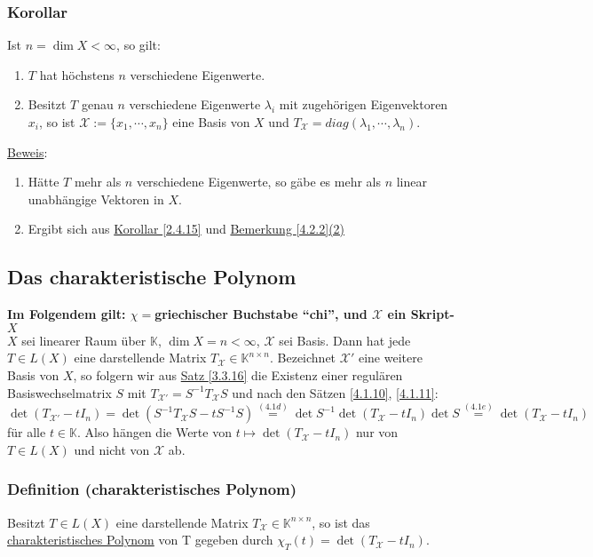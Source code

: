 \subsubsection{Korollar}
Ist $n=\dim X<\infty$, so gilt:
\renewcommand{\labelenumi}{(\alph{enumi})}
\begin{enumerate}
\item $T$ hat höchstens $n$ verschiedene Eigenwerte.
\item Besitzt $T$ genau $n$ verschiedene Eigenwerte $\lambda _i$ mit zugehörigen Eigenvektoren $x_i$, so ist $\mathcal{X}:=\{x_1,\cdots ,x_n\}$ eine Basis von $X$ und $T_\mathcal{X}=diag(\lambda _1,\cdots ,\lambda _n)$.
\end{enumerate}
\underline{Beweis}:
\begin{enumerate}
\item Hätte $T$ mehr als $n$ verschiedene Eigenwerte, so gäbe es mehr als $n$ linear unabhängige Vektoren in $X$.
\item Ergibt sich aus \hyperref[2.4.15]{Korollar \ref{2.4.15}} und \hyperref[4.2.2]{Bemerkung \ref{4.2.2}(2)}
\end{enumerate}
\subsection{Das charakteristische Polynom}
\textbf{Im Folgendem gilt: $\chi =$griechischer Buchstabe "`chi"', und $\mathcal{X}$ ein Skript-$X$\\}
$X$ sei linearer Raum über $\mathbb{K}$, $\dim X=n<\infty$, $\mathcal{X}$ sei Basis.  Dann hat jede $T\in L(X)$ eine darstellende Matrix $T_\mathcal{X}\in \mathbb{K}^{n\times n}$.  Bezeichnet $\mathcal{X}'$ eine weitere Basis von $X$, so folgern wir aus \hyperref[3.3.16]{Satz \ref{3.3.16}} die Existenz einer regulären Basiswechselmatrix $S$ mit $T_{\mathcal{X}'}=S^{-1}T_\mathcal{X}S$ und nach den Sätzen \hyperref[4.1.10]{\ref{4.1.10}}, \hyperref[4.1.11]{\ref{4.1.11}}:
\[\det (T_{\mathcal{X}'}-tI_n)=\det (S^{-1}T_\mathcal{X}S-tS^{-1}S)\stackrel{\hyperref[4.1d]{(4.1d)}}{=}\det S^{-1}\det (T_\mathcal{X}-tI_n)\det S\stackrel{\hyperref[4.1e]{(4.1e)}}{=}\det (T_\mathcal{X}-tI_n)\]
für alle $t\in \mathbb{K}$.  Also hängen die Werte von $t\mapsto \det (T_\mathcal{X}-tI_n)$ nur von $T\in L(X)$ und nicht von $\mathcal{X}$ ab.
\subsubsection{Definition (charakteristisches Polynom)}
Besitzt $T\in L(X)$ eine darstellende Matrix $T_\mathcal{X}\in\mathbb{K}^{n\times n}$, so ist das \underline{charakteristisches Polynom} von T gegeben durch $\chi _T(t)=\det (T_\mathcal{X}-tI_n)$.
